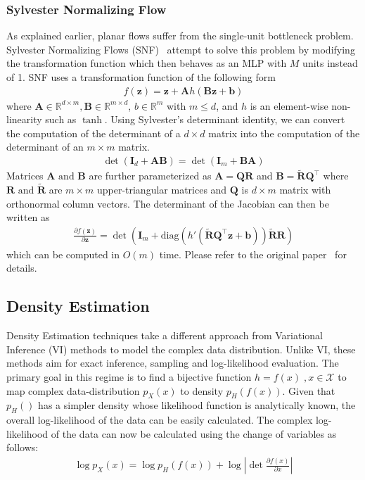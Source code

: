 \documentclass[runningheads]{llncs}
\begin{document}
\subsubsection{Sylvester Normalizing Flow} As explained earlier, planar flows suffer from the single-unit bottleneck problem. Sylvester Normalizing Flows (SNF)~\cite{van2018sylvester} attempt to solve this problem by modifying the transformation function which then behaves as an MLP with $M$ units instead of 1. SNF uses a transformation function of the following form 
\begin{align}
f(\mathbf{z}) = \mathbf{z} + \mathbf{A}h(\mathbf{B}\mathbf{z} + \mathbf{b})
\label{eq:sylfn}
\end{align}
where $\mathbf{A} \in \mathbb{R}^{d\times m},\mathbf{B} \in \mathbb{R}^{m \times d}$, $b \in \mathbb{R}^{m}$ with $m \leq d$, and $h$ is an element-wise non-linearity such as $\tanh$. Using Sylvester's determinant identity, we can convert the computation of the determinant of a $d \times d$ matrix into the computation of the determinant of an $m \times m$ matrix. 
\begin{align}
\det(\mathbf{I}_d + \mathbf{A}\mathbf{B}) = \det(\mathbf{I}_m + \mathbf{B}\mathbf{A})
\end{align}
Matrices $\mathbf{A}\text{ and }\mathbf{B}$ are further parameterized as $\mathbf{A} = \mathbf{Q}\mathbf{R}$ and $\mathbf{B} = \mathbf{\tilde{R}}\mathbf{Q}^\top$ where $\mathbf{R}\text{ and }\mathbf{\tilde{R}}$ are $m\times m$ upper-triangular matrices and $\mathbf{Q}$ is $d \times m $ matrix with orthonormal column vectors. The determinant of the Jacobian can then be written as
\begin{align}
\frac{\partial f(\mathbf{z})}{\partial \mathbf{z}} = \det \left(\mathbf{I}_m + \mathrm{diag}\left(h'(\mathbf{\tilde{R}}\mathbf{Q}^\top\mathbf{z} + \mathbf{b})\right)\mathbf{\tilde{R}}\mathbf{R}\right)
\end{align}
which can be computed in $O(m)$ time. Please refer to the original paper~\cite{van2018sylvester} for details.

\subsection{Density Estimation}
Density Estimation techniques take a different approach from Variational Inference (VI) methods to model the complex data distribution. Unlike VI, these methods aim for exact inference, sampling and log-likelihood evaluation. The primary goal in this regime is to find a bijective function $h=f(x)\;,x \in \mathcal{X}$ to map complex data-distribution $p_X(x)$ to density $p_H(f(x))$. Given that $p_H()$ has a simpler density whose likelihood function is analytically known, the overall log-likelihood of the data can be easily calculated. The complex log-likelihood of the data can now be calculated using the change of variables as follows:
\begin{align}
\log p_X(x)  = \log p_H(f(x)) +
\log\left| \det\frac{\partial f(x)}{\partial x} \right| \label{eq:log-likelihood}
\end{align}
\end{document}
